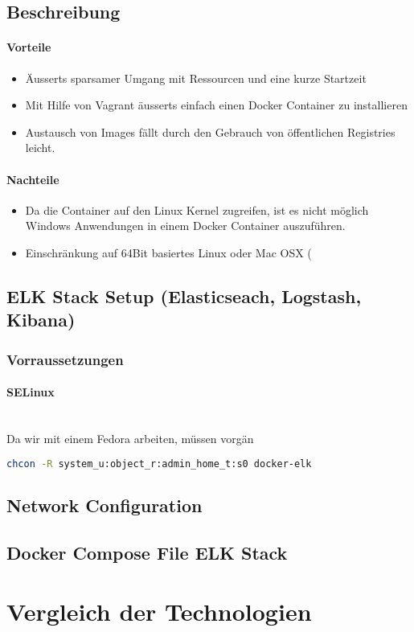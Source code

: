 \subsection{Beschreibung}
\paragraph{Vorteile}
\begin{itemize}
	\item Äusserts sparsamer Umgang mit Ressourcen und eine kurze Startzeit	
	\item Mit Hilfe von Vagrant äusserts einfach einen Docker Container zu installieren
	\item Austausch von Images fällt durch den Gebrauch von öffentlichen Registries leicht.
\end{itemize}
\paragraph{Nachteile}
\begin{itemize}
	\item Da die Container auf den Linux Kernel zugreifen, ist es nicht möglich Windows Anwendungen in einem Docker Container auszuführen.
	\item Einschränkung auf 64Bit basiertes Linux oder Mac OSX (%
\end{itemize}

\subsection{ELK Stack Setup (Elasticseach, Logstash, Kibana)}
\subsubsection{Vorraussetzungen}
\paragraph{SELinux} \hfill \\
Da wir mit einem Fedora arbeiten, müssen vorgän
\begin{lstlisting}[language=bash]
chcon -R system_u:object_r:admin_home_t:s0 docker-elk
\end{lstlisting}



\subsection{Network Configuration}

\subsection{Docker Compose File ELK Stack}




\section{Vergleich der Technologien}



